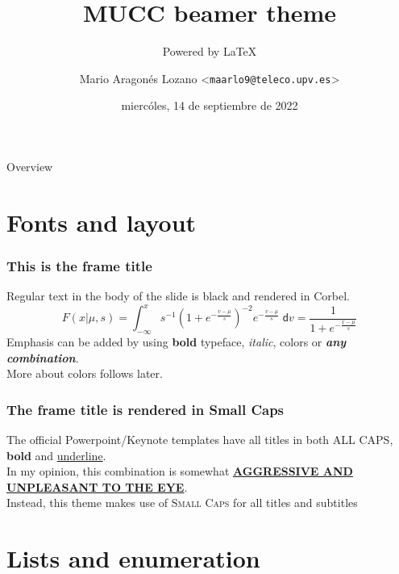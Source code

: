 \documentclass[aspectratio=169]{beamer}
\title{MUCC beamer theme}
\subtitle{Powered by \LaTeX}
\date{miercóles, 14 de septiembre de 2022}
\author[maarlo9]{Mario Aragonés Lozano <\texttt{maarlo9@teleco.upv.es}>}
\begin{document}
\titleframe

\begin{frame}{Overview}
    \tableofcontents[hideallsubsections]
\end{frame}

\section{Fonts and layout}

\begin{frame}
    \frametitle{This is the frame title}
    Regular text in the body of the slide is black and rendered in Corbel.\\[.5cm]
    \begin{equation*}
        F(x|\mu,s) = \int_{-\infty}^x s^{-1}\left(1+e^{-\frac{v-\mu}{s}}\right)^{-2} e^{-\frac{v-\mu}{s}}\;\mathsf{d}v = \frac{1}{1+e^{-\frac{x-\mu}{s}}}
    \end{equation*}
    Emphasis can be added by using \textbf{bold} typeface, \textit{italic}, {\color{mucc-alert}colors} or {\color{mucc-alert}\textbf{\textit{any combination}}}.\\
    More about colors follows later.
\end{frame}

\begin{frame}
    \frametitle{The frame title is rendered in Small Caps}
    The official Powerpoint/Keynote templates have all titles in both ALL CAPS, \textbf{bold} and \underline{underline}.\\[.5cm]
    In my opinion, this combination is somewhat \underline{\textbf{AGGRESSIVE AND UNPLEASANT TO THE EYE}}.\\[.5cm]
    Instead, this theme makes use of \textsc{Small Caps} for all titles and subtitles
\end{frame}


\section{Lists and enumeration}
\end{document}

